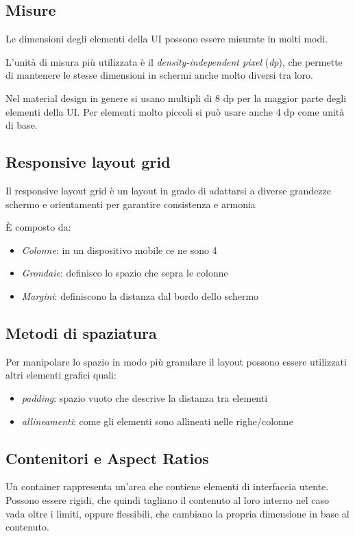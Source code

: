 \documentclass[12pt, a4paper]{report}
\begin{document}
		\subsection{Misure}
		Le dimensioni degli elementi della UI possono essere misurate in molti modi.

		L'unità di misura più utilizzata è il \textit{density-independent pixel} (\textit{dp}), che permette di mantenere le stesse dimensioni in schermi anche molto diversi tra loro.

		Nel material design in genere si usano multipli di 8 dp per la maggior parte degli elementi della UI. Per elementi molto piccoli si può usare anche 4 dp come unità di base.

		\subsection{Responsive layout grid}
			Il responsive layout grid è un layout in grado di adattarsi a diverse grandezze schermo e orientamenti per garantire consistenza e armonia \cite{layout_grid}

			È composto da:
			\begin{itemize}
				\item \textit{Colonne}: in un dispositivo mobile ce ne sono 4
				\item \textit{Grondaie}: definisco lo spazio che sepra le colonne
				\item \textit{Margini}: definiscono la distanza dal bordo dello schermo
			\end{itemize}

		\subsection{Metodi di spaziatura}
			Per manipolare lo spazio in modo più granulare il layout possono essere utilizzati altri elementi grafici quali:
			\begin{itemize}
				\item \textit{padding}: spazio vuoto che descrive la distanza tra elementi
				\item \textit{allineamenti}: come gli elementi sono allineati nelle righe/colonne
			\end{itemize}

		\subsection{Contenitori e Aspect Ratios}
			Un container rappresenta un'area che contiene elementi di interfaccia utente.
			Possono essere rigidi, che quindi tagliano il contenuto al loro interno nel caso vada oltre i limiti, oppure flessibili, che cambiano la propria dimensione in base al contenuto.
\end{document}
